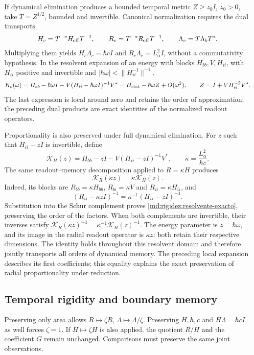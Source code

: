 If dynamical elimination produces a bounded temporal metric
$Z\ge z_0I$, $z_0>0$, take $T=Z^{1/2}$, bounded and invertible.
Canonical normalization requires the dual transports
\[
 H_c=T^{-*}H_{\rm eff}T^{-1},\qquad
 R_c=T^{-*}R_{\rm eff}T^{-1},\qquad
 \Lambda_c=T\Lambda_bT^*.
\]
Multiplying them yields $H_c\Lambda_c=\hbar cI$ and
$R_c\Lambda_c=L_\alpha^2I$, without a commutativity hypothesis.
In the resolvent expansion of an energy with blocks $H_{bb},V,H_{ii}$,
with $H_{ii}$ positive and invertible and
$|\hbar\omega|<\|H_{ii}^{-1}\|^{-1}$,
\[
 K_b(\omega)=H_{bb}-\hbar\omega I
 -V(H_{ii}-\hbar\omega I)^{-1}V^*
 =H_{\rm stat}-\hbar\omega Z+O(\omega^2),
 \qquad Z=I+VH_{ii}^{-2}V^*.
\]
The last expression is local around zero and retains the order of
approximation; the preceding dual products are exact identities
of the normalized readout operators.

Proportionality is also preserved under full dynamical elimination.
For $z$ such that $H_{ii}-zI$ is invertible, define
\[
 \mathcal K_H(z)=H_{bb}-zI-V(H_{ii}-zI)^{-1}V^*,\qquad
 \kappa=\frac{L_\alpha^2}{\hbar c}.
\]
The same readout--memory decomposition applied to $R=\kappa H$
produces
\begin{equation}
 \mathcal K_R(\kappa z)=\kappa\mathcal K_H(z).
 \label{md:rigidez:resolvente-exacto}
\end{equation}
Indeed, its blocks are $R_{bb}=\kappa H_{bb}$,
$R_{bi}=\kappa V$ and $R_{ii}=\kappa H_{ii}$, and
\[
 (R_{ii}-\kappa zI)^{-1}
 =\kappa^{-1}(H_{ii}-zI)^{-1}.
\]
Substitution into the Schur complement proves
\eqref{md:rigidez:resolvente-exacto}, preserving the order of the factors.
When both complements are invertible, their inverses satisfy
$\mathcal K_R(\kappa z)^{-1}=\kappa^{-1}\mathcal K_H(z)^{-1}$.
The energy parameter is $z=\hbar\omega$, and its image in the radial
readout operator is $\kappa z$: both retain their respective dimensions.
The identity holds throughout this resolvent domain and therefore
jointly transports all orders of dynamical memory. The preceding local
expansion describes its first coefficients; this equality explains
the exact preservation of radial proportionality under reduction.

\subsection{Temporal rigidity and boundary memory}
\label{md:rigidez:memoria}

Preserving only area allows $R\mapsto\zeta R$,
$\Lambda\mapsto\Lambda/\zeta$. Preserving $H,\hbar,c$ and
$H\Lambda=\hbar cI$ as well forces $\zeta=1$. If
$H\mapsto\zeta H$ is also applied, the quotient $R/H$ and the
coefficient $G$ remain unchanged. Comparisons must preserve the same
joint observations.

